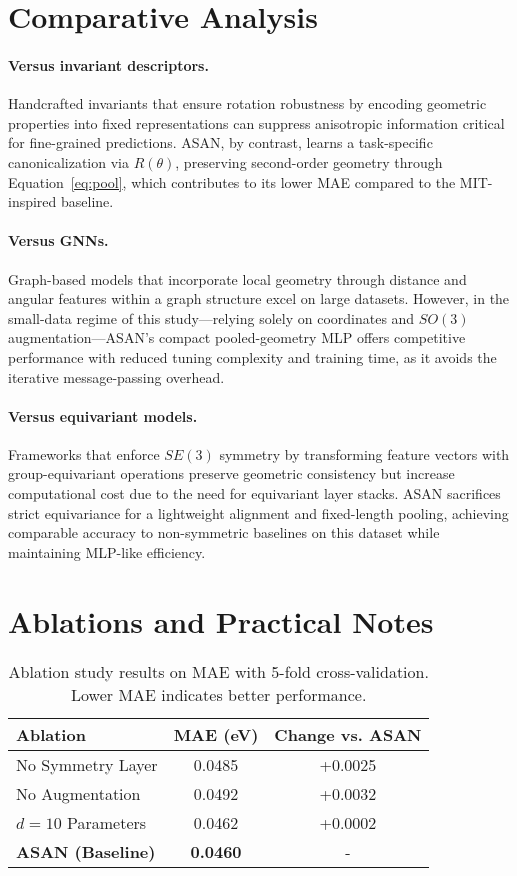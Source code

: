 \documentclass[12pt]{article}
\begin{document}
\section{Comparative Analysis}
\paragraph{Versus invariant descriptors.} Handcrafted invariants that ensure rotation robustness by encoding geometric properties into fixed representations can suppress anisotropic information critical for fine-grained predictions. ASAN, by contrast, learns a task-specific canonicalization via $R(\theta)$, preserving second-order geometry through Equation~\ref{eq:pool}, which contributes to its lower MAE compared to the MIT-inspired baseline.

\paragraph{Versus GNNs.} Graph-based models that incorporate local geometry through distance and angular features within a graph structure excel on large datasets. However, in the small-data regime of this study—relying solely on coordinates and $SO(3)$ augmentation—ASAN’s compact pooled-geometry MLP offers competitive performance with reduced tuning complexity and training time, as it avoids the iterative message-passing overhead.

\paragraph{Versus equivariant models.} Frameworks that enforce $SE(3)$ symmetry by transforming feature vectors with group-equivariant operations preserve geometric consistency but increase computational cost due to the need for equivariant layer stacks. ASAN sacrifices strict equivariance for a lightweight alignment and fixed-length pooling, achieving comparable accuracy to non-symmetric baselines on this dataset while maintaining MLP-like efficiency.

\section{Ablations and Practical Notes}
\begin{table}[h]
  \centering
  \begin{tabular}{lcc}
    \toprule
    Ablation & MAE (eV) & Change vs. ASAN \\
    \midrule
    No Symmetry Layer & 0.0485 & +0.0025 \\
    No Augmentation & 0.0492 & +0.0032 \\
    $d=10$ Parameters & 0.0462 & +0.0002 \\
    \textbf{ASAN (Baseline)} & \textbf{0.0460} & - \\
    \bottomrule
  \end{tabular}
  \caption{Ablation study results on MAE with 5-fold cross-validation. Lower MAE indicates better performance.}
  \label{tab:ablations}
\end{table}
\end{document}

